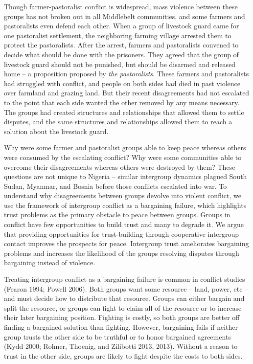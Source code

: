 \documentclass[11pt]{article}
\begin{document}
Though farmer-pastoralist conflict is widespread, mass violence between
these groups has not broken out in all Middlebelt communities, and some
farmers and pastoralists even defend each other. When a group of
livestock guard came for one pastoralist settlement, the neighboring
farming village arrested them to protect the pastoralists. After the
arrest, farmers and pastoralists convened to decide what should be done
with the prisoners. They agreed that the group of livestock guard should
not be punished, but should be disarmed and released home -- a
proposition proposed by \emph{the pastoralists}. These farmers and
pastoralists had struggled with conflict, and people on both sides had
died in past violence over farmland and grazing land. But their recent
disagreements had not escalated to the point that each side wanted the
other removed by any means necessary. The groups had created structures
and relationships that allowed them to settle disputes, and the same
structures and relationships allowed them to reach a solution about the
livestock guard.

Why were some farmer and pastoralist groups able to keep peace whereas
others were consumed by the escalating conflict? Why were some
communities able to overcome their disagreements whereas others were
destroyed by them? These questions are not unique to Nigeria -- similar
intergroup dynamics plagued South Sudan, Myanmar, and Bosnia before
those conflicts escalated into war. To understand why disagreements
between groups devolve into violent conflict, we use the framework of
intergroup conflict as a bargaining failure, which highlights trust
problems as the primary obstacle to peace between groups. Groups in
conflict have few opportunities to build trust and many to degrade it.
We argue that providing opportunities for trust-building through
cooperative intergroup contact improves the prospects for peace.
Intergroup trust ameliorates bargaining problems and increases the
likelihood of the groups resolving disputes through bargaining instead
of violence.

Treating intergroup conflict as a bargaining failure is common in
conflict studies (Fearon 1994; Powell 2006). Both groups want some
resource -- land, power, etc -- and must decide how to distribute that
resource. Groups can either bargain and split the resource, or groups
can fight to claim all of the resource or to increase their later
bargaining position. Fighting is costly, so both groups are better off
finding a bargained solution than fighting. However, bargaining fails if
neither group trusts the other side to be truthful or to honor bargained
agreements (Kydd 2000; Rohner, Thoenig, and Zilibotti 2013, 2013).
Without a reason to trust in the other side, groups are likely to fight
despite the costs to both sides.
\end{document}
